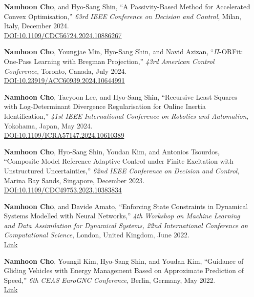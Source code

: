 \begin{enumerate}[itemsep=0.5em, label={[}C\arabic*{]}]
\item \textbf{Namhoon Cho}, and Hyo-Sang Shin, ``A Passivity-Based Method for Accelerated Convex Optimisation,'' \textit{63rd IEEE Conference on Decision and Control}, Milan, Italy, December 2024. \\
\href{https://doi.org/10.1109/CDC56724.2024.10886267}{DOI:10.1109/CDC56724.2024.10886267}

\item \textbf{Namhoon Cho}, Youngjae Min, Hyo-Sang Shin, and Navid Azizan, ``$\Pi$-ORFit: One-Pass Learning with Bregman Projection,'' \textit{43rd American Control Conference}, Toronto, Canada, July 2024. \\
\href{https://doi.org/10.23919/ACC60939.2024.10644991}{DOI:10.23919/ACC60939.2024.10644991}

\item \textbf{Namhoon Cho}, Taeyoon Lee, and Hyo-Sang Shin, ``Recursive Least Squares with Log-Determinant Divergence Regularisation for Online Inertia Identification,'' \textit{41st IEEE International Conference on Robotics and Automation}, Yokohama, Japan, May 2024. \\
\href{https://doi.org/10.1109/ICRA57147.2024.10610389}{DOI:10.1109/ICRA57147.2024.10610389}

\item \textbf{Namhoon Cho}, Hyo-Sang Shin, Youdan Kim, and Antonios Tsourdos, ``Composite Model Reference Adaptive Control under Finite Excitation with Unstructured Uncertainties,'' \textit{62nd IEEE Conference on Decision and Control}, Marina Bay Sands, Singapore, December 2023. \\
\href{https://doi.org/10.1109/CDC49753.2023.10383834}{DOI:10.1109/CDC49753.2023.10383834}

\item \textbf{Namhoon Cho}, and Davide Amato, ``Enforcing State Constraints in Dynamical Systems Modelled with Neural Networks,'' \textit{4th Workshop on Machine Learning and Data Assimilation for Dynamical Systems, 22nd International Conference on Computational Science}, London, United Kingdom, June 2022. \\
\href{http://hdl.handle.net/10044/1/99648}{Link}

\item \textbf{Namhoon Cho}, Youngil Kim, Hyo-Sang Shin, and Youdan Kim, ``Guidance of Gliding Vehicles with Energy Management Based on Approximate Prediction of Speed,'' \textit{6th CEAS EuroGNC Conference}, Berlin, Germany, May 2022. \\
\href{https://eurognc.ceas.org/archive/EuroGNC2022/html/CEAS-GNC-2022-071.html}{Link}


\end{enumerate}
